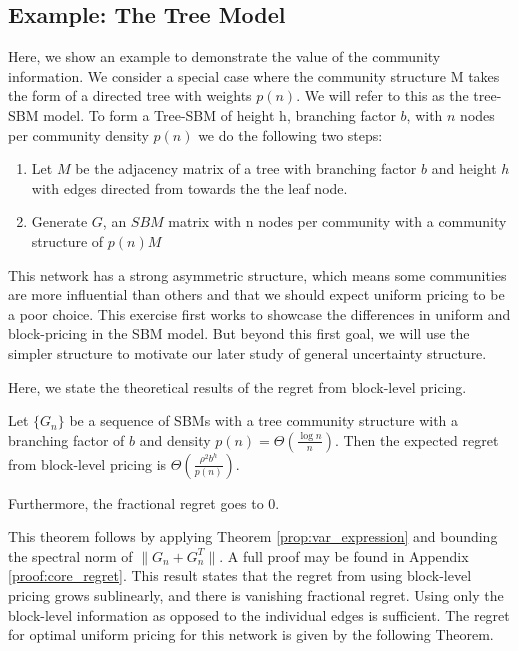 \subsection{Example: The Tree Model}
Here, we show an example to demonstrate the value of the community information. We consider a special case where the community structure M takes the form of a directed tree with weights $p(n)$. We will refer to this as the tree-SBM model. To form a Tree-SBM of height h, branching factor $b$, with $n$ nodes per community density $p(n)$  we do the following two steps:
\begin{enumerate}
    \item Let $M$ be the adjacency matrix of a tree with branching factor $b$ and height $h$ with edges directed from towards the the leaf node. 
    \item Generate $G$, an $SBM$ matrix with n nodes per community with a community structure of $p(n) M$
\end{enumerate}


This network has a strong asymmetric structure, which means some communities are more influential than others and that we should expect uniform pricing to be a poor choice. This exercise first works to showcase the differences in uniform and block-pricing in the SBM model. But beyond this first goal, we will use the simpler structure to motivate our later study of general uncertainty structure.

Here, we state the theoretical results of the regret from block-level pricing. 

\begin{theorem}\label{thm:core_regret}
    Let $\{G_n\}$ be a sequence of SBMs with a tree community structure with a branching factor of $b$ and density $p(n) = \Theta( \frac{\log n}{n})$. Then the expected regret from block-level pricing is $\Theta\left(\frac{\rho^2 b^{h}}{ p(n)}\right)$.

    Furthermore, the fractional regret goes to $0$.
\end{theorem}

This theorem follows by applying Theorem \ref{prop:var_expression} and bounding the spectral norm of $\|G_n +G_n^T\|$. A full proof may be found in Appendix \ref{proof:core_regret}. This result states that the regret from using block-level pricing grows sublinearly, and there is vanishing fractional regret. Using only the block-level information as opposed to the individual edges is sufficient. The regret for optimal uniform pricing for this network is given by the following Theorem.

